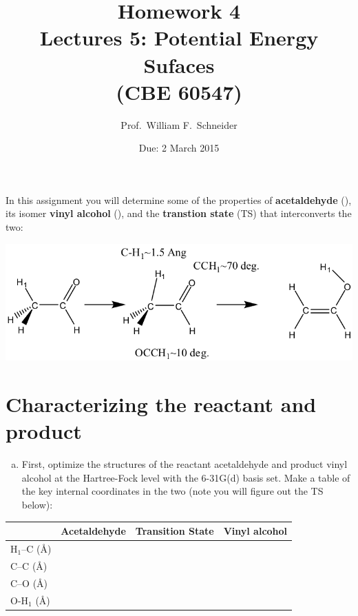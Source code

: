 \documentclass[11pt]{article}
\date{Due: 2 March 2015}
\title{}
\begin{document}
\title{Homework 4\\Lectures 5: Potential Energy Sufaces\\(CBE 60547)}
\author{Prof.\ William F.\ Schneider}
\maketitle

In this assignment you will determine some of the properties of \textbf{acetaldehyde} (), its isomer \textbf{vinyl alcohol} (), and the \textbf{transtion state} (TS) that interconverts the two:

\begin{center}
\includegraphics[width=.9\linewidth]{fig1.png}
\end{center}



\section{Characterizing the reactant and product}
\label{sec-1}

\begin{enumerate}[(a)]
\item First, optimize the structures of the reactant acetaldehyde and product vinyl alcohol at the Hartree-Fock level with the 6-31G(d) basis set. Make a table of the key internal coordinates in the two (note you will figure out the TS below):
\end{enumerate}

\begin{center}
\begin{tabular}{llll}
\hline
 & Acetaldehyde & Transition State & Vinyl alcohol\\
\hline
H$_{\text{1}}$–C (\AA{}) &  &  & \\
C–C (\AA{}) &  &  & \\
C–O (\AA{}) &  &  & \\
O-H$_{\text{1}}$ (\AA{}) &  &  & \\
\hline
\end{tabular}
\end{center}
\end{document}
